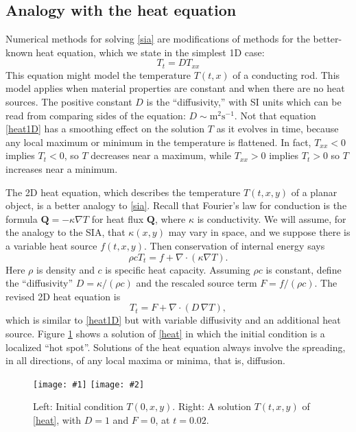 \documentclass[letterpaper,final,12pt,reqno]{amsart}
\newcommand{\grad}{\nabla}
\newcommand{\Div}{\nabla\cdot}
\newcommand{\twofigsizes}[5]{
\begin{figure}[ht]
\centering
\texttt{[image: \#1]} \quad
\texttt{[image: \#2]}
\caption{#3}
\label{fig:#1}
\end{figure}}
\begin{document}
\subsection*{Analogy with the heat equation}  Numerical methods for solving \eqref{sia} are modifications of methods for the better-known heat equation, which we state in the simplest 1D case:
\begin{equation}
T_t = D T_{xx} \label{heat1D}
\end{equation}
This equation might model the temperature $T(t,x)$ of a conducting rod.  This model applies when material properties are constant and when there are no heat sources.  The positive constant $D$ is the ``diffusivity,'' with SI units which can be read from comparing sides of the equation: $D\sim \text{m}^2 \text{s}^{-1}$.  Not that equation \eqref{heat1D} has a smoothing effect on the solution $T$ as it evolves in time, because any local maximum or minimum in the temperature is flattened.  In fact, $T_{xx}<0$ implies $T_t<0$, so $T$ decreases near a maximum, while $T_{xx}>0$ implies $T_t>0$ so $T$ increases near a minimum.

The 2D heat equation, which describes the temperature $T(t,x,y)$ of a planar object, is a better analogy to \eqref{sia}.  Recall that Fourier's law for conduction is the formula $\mathbf{Q} = - \kappa \grad T$ for heat flux $\mathbf{Q}$, where $\kappa$ is conductivity.  We will assume, for the analogy to the SIA, that $\kappa(x,y)$ may vary in space, and we suppose there is a variable heat source $f(t,x,y)$.  Then conservation of internal energy says
\begin{equation}
\rho c T_t = f + \Div (\kappa \grad T). \label{heatearly}
\end{equation}
Here $\rho$ is density and $c$ is specific heat capacity.  Assuming $\rho c$ is constant, define the ``diffusivity'' $D=\kappa/(\rho c)$ and the rescaled source term $F = f/(\rho c)$.  The revised 2D heat equation is
\begin{equation}
T_t = F + \Div (D\, \grad T), \label{heat}
\end{equation}
which is similar to \eqref{heat1D} but with variable diffusivity and an additional heat source.  Figure \ref{fig:initialheat} shows a solution of \eqref{heat} in which the initial condition is a localized ``hot spot''.  Solutions of the heat equation always involve the spreading, in all directions, of any local maxima or minima, that is, diffusion.

\twofigsizes{initialheat}{finalheat}{Left: Initial condition $T(0,x,y)$.   Right: A solution $T(t,x,y)$ of  \eqref{heat}, with $D=1$ and $F=0$, at $t=0.02$.}{2.8in}{2.8in}
\end{document}
